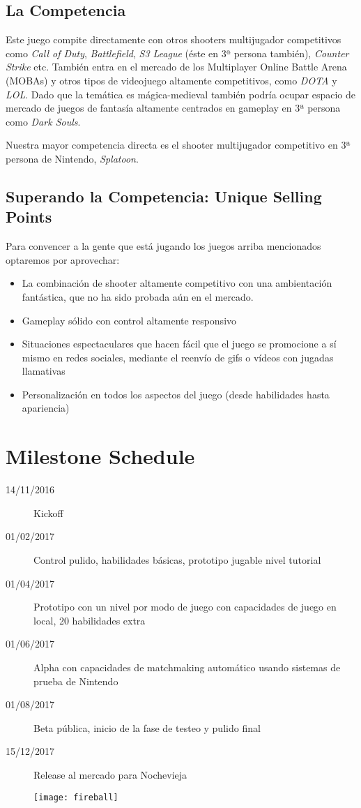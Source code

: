\documentclass[12pt]{article}
\begin{document}
\subsection{La Competencia}
Este juego compite directamente con otros shooters multijugador competitivos como \textit{Call of Duty}, \textit{Battlefield}, \textit{S3 League} (éste en 3ª persona también), \textit{Counter Strike} etc. También entra en el mercado de los Multiplayer Online Battle Arena (MOBAs) y otros tipos de videojuego altamente competitivos, como \textit{DOTA} y \textit{LOL}. Dado que la temática es mágica-medieval también podría ocupar espacio de mercado de juegos de fantasía altamente centrados en gameplay en 3ª persona como \textit{Dark Souls}.

Nuestra mayor competencia directa es el shooter multijugador competitivo en 3ª persona de Nintendo, \textit{Splatoon}. 

\subsection{Superando la Competencia: Unique Selling Points}
Para convencer a la gente que está jugando los juegos arriba mencionados optaremos por aprovechar:

\begin{itemize}
\item La combinación de shooter altamente competitivo con una ambientación fantástica, que no ha sido probada aún en el mercado.
\item Gameplay sólido con control altamente responsivo
\item Situaciones espectaculares que hacen fácil que el juego se promocione a sí mismo en redes sociales, mediante el reenvío de gifs o vídeos con jugadas llamativas
\item Personalización en todos los aspectos del juego (desde habilidades hasta apariencia)
\end{itemize}

\newpage

\section{Milestone Schedule}

\begin{description}
	\item[14/11/2016] Kickoff
	\item[01/02/2017] Control pulido, habilidades básicas, prototipo jugable nivel tutorial
	\item[01/04/2017] Prototipo con un nivel por modo de juego con capacidades de juego en local, 20 habilidades extra
	\item[01/06/2017] Alpha con capacidades de matchmaking automático usando sistemas de prueba de Nintendo
	\item[01/08/2017] Beta pública, inicio de la fase de testeo y pulido final
	\item[15/12/2017] Release al mercado para Nochevieja
\end{description}

\cleardoublepage

\thispagestyle{empty}

\vspace*{\fill}

\begin{figure}[h]
    \centering
    \texttt{[image: fireball]}
\end{figure}

\vfill
\end{document}

